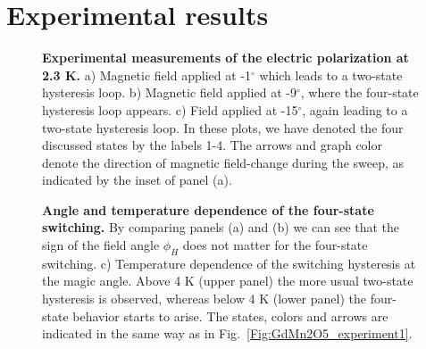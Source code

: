 \section{Experimental results}
\begin{figure}
    \centering
\caption{ \label{fig:GdMn2O5_experiment1} {\bf Experimental measurements of the electric polarization at 2.3 K.} a) Magnetic field applied at -1$^\circ$ which leads to a two-state hysteresis loop. b) Magnetic field applied at -9$^\circ$, where the four-state hysteresis loop appears. c) Field applied at -15$^\circ$, again leading to a two-state hysteresis loop.  
In these plots, we have denoted the four discussed states by the labels 1-4. The arrows and graph color denote the direction of magnetic field-change during the sweep, as indicated by the inset of panel (a).}
\end{figure}
\begin{figure}
    \centering
\caption{ \label{fig:GdMn2O5_experiment2} {\bf Angle and temperature dependence of the four-state switching.} By comparing panels (a) and (b) we can see that the sign of the field angle $\phi_H$ does not matter for the four-state switching. c) Temperature dependence of the switching hysteresis at the magic angle. Above 4 K (upper panel) the more usual two-state hysteresis is observed, whereas below 4 K (lower panel) the four-state behavior starts to arise. The states, colors and arrows are indicated in the same way as in Fig.~\ref{Fig:GdMn2O5_experiment1}.}
\end{figure}


